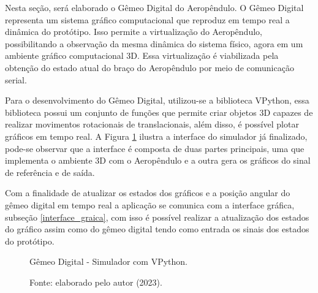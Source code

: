 Nesta seção, será elaborado o Gêmeo Digital do Aeropêndulo. O Gêmeo Digital representa um sistema gráfico computacional que reproduz em tempo real a dinâmica do protótipo. Isso permite a virtualização do Aeropêndulo, possibilitando a observação da mesma dinâmica do sistema físico, agora em um ambiente gráfico computacional 3D. Essa virtualização é viabilizada pela obtenção do estado atual do braço do Aeropêndulo por meio de comunicação serial.

Para o desenvolvimento do Gêmeo Digital, utilizou-se a biblioteca VPython, essa biblioteca possui um conjunto de funções que permite criar objetos 3D capazes de realizar movimentos rotacionais de translacionais, além disso, é possível plotar gráficos em tempo real. A Figura \ref{fig3:image_13_1} ilustra a interface do simulador já finalizado, pode-se observar que a interface é composta de duas partes principais, uma que implementa o ambiente 3D com o Aeropêndulo e a outra gera os gráficos do sinal de referência e de saída.

Com a finalidade de atualizar os estados dos gráficos e a posição angular do gêmeo digital em tempo real a aplicação se comunica com a interface gráfica, subseção \ref{interface_graica}, com isso é possível realizar a atualização dos estados do gráfico assim como do gêmeo digital tendo como entrada os sinais dos estados do protótipo.

\begin{figure}[!h]
	\centering
	\caption{Gêmeo Digital - Simulador com VPython.}
        \vspace{0.001cm}
	\caption*{Fonte: elaborado pelo autor (2023).}
	\label{fig3:image_13_1}
\end{figure}


